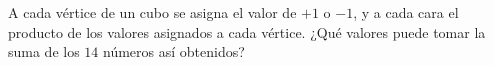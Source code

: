 A cada vértice de un cubo se asigna el valor de $+1$ o $-1$, y a cada cara el producto de los valores asignados a cada vértice. ¿Qué valores puede tomar la suma de los $14$ números así obtenidos?